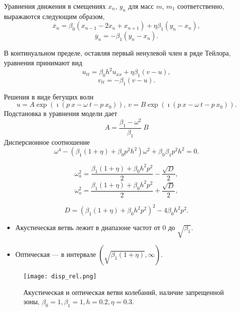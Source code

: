 \begin{frame}
	Уравнения движения в смещениях $x_n$, $y_n$ для масс $m$, $m_1$ соответственно, выражаются следующим образом,
\begin{equation}
	\ddot{x_n}=\beta_0 (x_{n-1}-2x_n+x_{n+1})+\eta \beta_1 (y_n-x_n), 
	\label{eq1}
\end{equation}
\begin{equation}
	\ddot{y_n}=-\beta_1 (y_n-x_n).
\end{equation}

В континуальном пределе, оставляя первый ненулевой член в ряде Тейлора, уравнения принимают вид
\begin{equation}
	u_{tt}=\beta_0 h^2 u_{xx}+\eta \beta_1 (v-u), \label{eq3}
\end{equation}
\begin{equation}
	v_{tt}=-\beta_1 (v-u). \label{eq4}
\end{equation}
	
\end{frame}

\begin{frame}
	Решения в виде бегущих волн
	$$
	u=A \exp (\imath(p~ x - \omega~ t- p~ x_0)), ~
	v=B \exp (\imath(p~ x - \omega~ t-p~ x_0)).
	$$
	Подстановка в уравнения модели дает
	$$
	A = \frac{\beta_1-\omega^2}{\beta_1}~B
	$$
	Дисперсионное соотношение
	$$
	\omega^4 -(\beta_1(1+\eta)+\beta_0 p^2 h^2)\omega^2+\beta_0 \beta_1 p^2 h^2=0.
	$$
	\begin{small}
	$$
		\omega_a^2=\frac{\beta_1(1+\eta)+\beta_0 h^2 p^2}{2}-\frac{\sqrt{D}}{2},
	$$
	$$
		\omega_o^2=\frac{\beta_1(1+\eta)+\beta_0 h^2 p^2}{2}+\frac{\sqrt{D}}{2},
	$$

	$$
	D=(\beta_1(1+\eta)+\beta_0 h^2 p^2)^2-4\beta_0 h^2 p^2.
	$$
	\end{small}
\end{frame}

\begin{frame}
	\begin{itemize}
		\item Акустическая ветвь лежит в диапазоне частот от $ 0 $ до $ \sqrt {\beta_1} $.
		\item Оптическая --- в интервале $(\sqrt{\beta_1(1+\eta)}, \infty)$.
	\end{itemize}
	\begin{figure}
		\begin{center}
			\texttt{[image: disp\_rel.png]}
		\end{center}
		Акустическая и оптическая ветви колебаний, наличие запрещенной зоны, $\beta_0 = 1, \beta_1 = 1, h = 0.2, \eta = 0.3$.
	\end{figure}
\end{frame}



